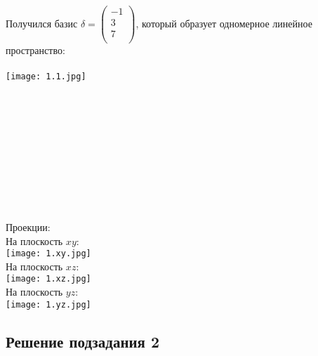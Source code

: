 \documentclass{article}
\begin{document}
    Получился базис $\delta = 
    \begin{pmatrix}
        -1 \\
        3 \\
        7\\
    \end{pmatrix}$, который образует одномерное линейное пространство: \\ \\
    \texttt{[image: 1.1.jpg]} \\ \\ \\ \\ \\ \\ \\ \\ \\ \\ \\
    Проекции: \\
    На плоскость $xy$: \\
    \texttt{[image: 1.xy.jpg]} \\
    На плоскость $xz$: \\
    \texttt{[image: 1.xz.jpg]} \\
    На плоскость $yz$: \\
    \texttt{[image: 1.yz.jpg]} \\

    \subsection{Решение подзадания 2}
\end{document}
